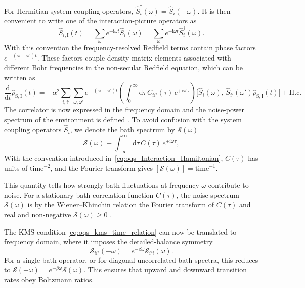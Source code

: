 For Hermitian system coupling operators, \(\hat{S}_i^\dagger(\omega)=\hat{S}_i(-\omega)\). It is then convenient to write one of the interaction-picture operators as
\begin{equation*}
	\hat{S}_{i,\mathrm{I}}(t)
	=
	\sum_{\omega} e^{-\mathrm{i}\omega t}\hat{S}_i(\omega)
	=
	\sum_{\omega} e^{+\mathrm{i}\omega t}\hat{S}_i^\dagger(\omega).
\end{equation*}
With this convention the frequency-resolved Redfield terms contain phase factors
\(e^{-\mathrm{i}(\omega-\omega')t}\). These factors couple density-matrix elements associated with different Bohr frequencies in the non-secular Redfield equation, which can be written as
\begin{equation}
	\frac{\mathrm{d}}{\mathrm{d}t}\hat{\rho}_{\mathrm{S},\mathrm{I}}(t) = -\alpha^2 \sum_{i,i'} \sum_{\omega,\omega'} e^{-\mathrm{i}(\omega - \omega')t}
	\left( \int_0^{\infty}\!\mathrm{d}\tau\, C_{ii'}(\tau)\, e^{+\mathrm{i} \omega' \tau} \right)
	\big[ \hat{S}_i(\omega),\, \hat{S}_{i'}(\omega') \hat{\rho}_{\mathrm{S},\mathrm{I}}(t) \big]
	+ \text{H.c.}
	\label{eq:oqs_Redfield_Frequency_Decomposed}
\end{equation}
The correlator is now expressed in the frequency domain and the noise-power spectrum of the environment is defined \cite{lambertetal2026qutip5quantum}. To avoid confusion with the system coupling operators $\hat{S}_i$, we denote the bath spectrum by $\mathcal{S}(\omega)$
\begin{equation}
	\mathcal{S}(\omega) \equiv \int_{-\infty}^{\infty}\!\mathrm{d}\tau\, C(\tau)\, e^{+\mathrm{i} \omega \tau},
	\label{eq:oqs_Noise_Power_Spectrum}
\end{equation}
With the convention introduced in~\autoref{eq:oqs_Interaction_Hamiltonian}, \(C(\tau)\) has units of \(\mathrm{time}^{-2}\), and the Fourier transform gives \([\mathcal{S}(\omega)]=\mathrm{time}^{-1}\).

This quantity tells how strongly bath fluctuations at frequency $\omega$ contribute to noise.
For a stationary bath correlation function $C(\tau)$, the noise spectrum $\mathcal{S}(\omega)$ is by the Wiener--Khinchin relation the Fourier transform of $C(\tau)$ and  real and non-negative
$\mathcal{S}(\omega)\ge 0$ \cite{clerketal2010introductionquantumnoise}.

The KMS condition \autoref{eq:oqs_kms_time_relation} can now be translated to frequency domain, where it imposes the detailed-balance symmetry
\begin{equation}
	\mathcal{S}_{ii'}(-\omega)
	=
	e^{-\beta\omega}\mathcal{S}_{i'i}(\omega).
	\label{eq:oqs_kms_spectral_relation}
\end{equation}
For a single bath operator, or for diagonal uncorrelated bath spectra, this reduces to
\(\mathcal{S}(-\omega)=e^{-\beta\omega}\mathcal{S}(\omega)\).
This ensures that upward and downward transition rates obey Boltzmann ratios.


